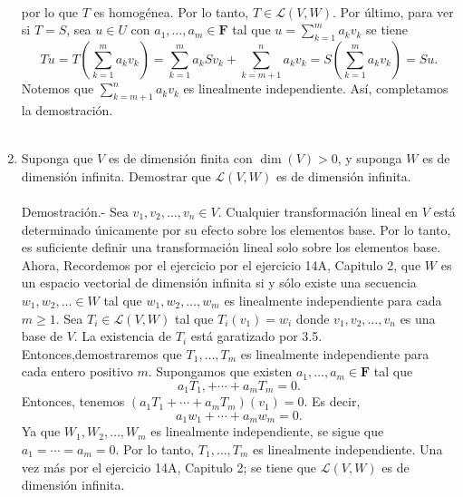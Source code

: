 \begin{enumerate}[\bfseries 1.]
$$\begin{array}{rcl}
	\end{array}
	$$
	por lo que $T$ es homogénea. Por lo tanto, $T\in \mathcal{L}(V,W)$. Por último, para ver si $T=S$, sea $u\in U$ con $a_1,\ldots,a_m\in \textbf{F}$ tal que $u=\sum_{k=1}^m a_kv_k$ se tiene
	$$Tu=T\left(\displaystyle\sum_{k=1}^m a_kv_k\right)=\displaystyle\sum_{k=1}^m a_kSv_k+\displaystyle\sum_{k=m+1}^n a_kv_k=S\left(\displaystyle\sum_{k=1}^m a_kv_k\right)=Su.$$
	Notemos que $\sum_{k=m+1}^n a_kv_k$ es linealmente independiente. Así, completamos la demostración.\\\\

    \item Suponga que $V$ es de dimensión finita con $\dim(V)>0$, y suponga $W$ es de dimensión infinita. Demostrar que $\mathcal{L}(V,W)$ es de dimensión infinita.\\\\
	Demostración.-\; Sea $v_1,v_2,\ldots,v_n\in V$. Cualquier transformación lineal en $V$ está determinado únicamente por su efecto sobre los elementos base. Por lo tanto, es suficiente definir una transformación lineal solo sobre los elementos base. Ahora, 
	Recordemos por el ejercicio por el ejercicio 14A, Capitulo 2, que $W$ es un espacio vectorial de dimensión infinita si y sólo existe una secuencia $w_1,w_2,\ldots \in W$ tal que $w_1,w_2,\ldots,w_m$ es linealmente independiente para cada $m\geq 1.$ Sea $T_i\in \mathcal{L}(V,W)$ tal que $T_i(v_1)=w_i$ donde $v_1,v_2,\ldots,v_n$ es una base de $V$. La existencia de $T_i$ está garatizado por 3.5. Entonces,demostraremos que $T_1,\ldots,T_m$ es linealmente independiente para cada entero positivo $m$. Supongamos que existen $a_1,\ldots,a_m\in \textbf{F}$ tal que
	$$a_1T_1,+\cdots+a_mT_m=0.$$
	Entonces, tenemos $(a_1T_1+\cdots+a_mT_m)(v_1)=0$. Es decir,
	$$a_1w_1+\cdots + a_mw_m=0.$$
	Ya que $W_1,W_2,\ldots,W_m$ es linealmente independiente, se sigue que $a_1=\cdots=a_m=0$. Por lo tanto, $T_1,\ldots,T_m$ es linealmente independiente. Una vez más por el ejercicio 14A, Capitulo 2; se tiene que $\mathcal{L}(V,W)$ es de dimensión infinita.\\\\


\end{enumerate}
